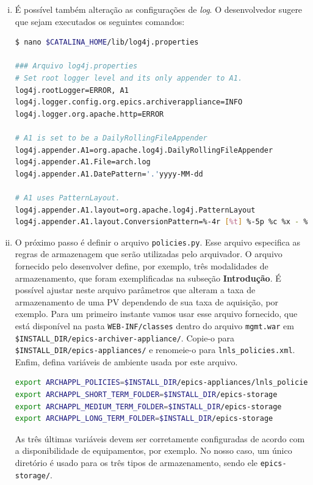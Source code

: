 \begin {enumerate}[i.]
Serão criadas 4 pastas dentro de \texttt{\$INSTALL\_DIR/epics-appliances}, uma
para cada módulo.

\item É possível também alteração as configurações de \textit{log}. O
desenvolvedor sugere que sejam executados os seguintes comandos:

\begin{lstlisting}[language=bash, style=nonumbers]
$ nano $CATALINA_HOME/lib/log4j.properties

### Arquivo log4j.properties
# Set root logger level and its only appender to A1.
log4j.rootLogger=ERROR, A1
log4j.logger.config.org.epics.archiverappliance=INFO
log4j.logger.org.apache.http=ERROR

# A1 is set to be a DailyRollingFileAppender
log4j.appender.A1=org.apache.log4j.DailyRollingFileAppender
log4j.appender.A1.File=arch.log
log4j.appender.A1.DatePattern='.'yyyy-MM-dd

# A1 uses PatternLayout.
log4j.appender.A1.layout=org.apache.log4j.PatternLayout
log4j.appender.A1.layout.ConversionPattern=%-4r [%t] %-5p %c %x - %m%n
\end{lstlisting}

\item O próximo passo é definir o arquivo \texttt{policies.py}. Esse arquivo
especifica as regras de armazenagem que serão utilizadas pelo arquivador. O
arquivo fornecido pelo desenvolver define, por exemplo, três modalidades de
armazenamento, que foram exemplificadas na subseção \textbf{Introdução}. É
possível ajustar neste arquivo parâmetros que alteram a taxa de armazenamento de
uma PV dependendo de sua taxa de aquisição, por exemplo. Para um primeiro
instante vamos usar esse arquivo fornecido, que está disponível na pasta
\texttt{WEB-INF/classes} dentro do arquivo \texttt{mgmt.war} em
\texttt{\$INSTALL\_DIR/epics-archiver-appliance/}. Copie-o para
\texttt{\$INSTALL\_DIR/epics-appliances/} e renomeie-o para
\texttt{lnls\_policies.xml}. Enfim, defina variáveis de ambiente usada por este
arquivo.

\begin{lstlisting}[language=bash, style=nonumbers]
export ARCHAPPL_POLICIES=$INSTALL_DIR/epics-appliances/lnls_policies.py
export ARCHAPPL_SHORT_TERM_FOLDER=$INSTALL_DIR/epics-storage
export ARCHAPPL_MEDIUM_TERM_FOLDER=$INSTALL_DIR/epics-storage
export ARCHAPPL_LONG_TERM_FOLDER=$INSTALL_DIR/epics-storage
\end{lstlisting}

As três últimas variáveis devem ser corretamente configuradas de acordo com a
disponibilidade de equipamentos, por exemplo. No nosso caso, um único diretório
é usado para os três tipos de armazenamento, sendo ele \texttt{epics-storage/}.


\end{enumerate}
